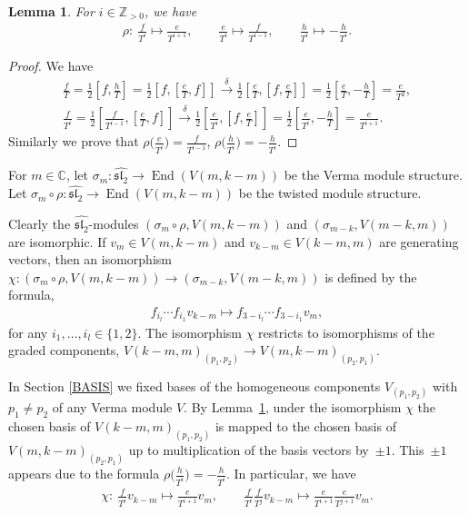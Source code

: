 \documentclass[pdftex]{sigma}
\numberwithin{equation}{section}
\newtheorem{lem}[thm]{Lemma}
\begin{document}
\begin{lem}\label{lem elts}For $i \in \mathbb{Z}_{> 0}$, we have
\begin{gather*}
\rho \colon \ \frac{f}{T^i} \mapsto \frac{e}{T^{i+1}}, \qquad \frac{e}{T^i} \mapsto \frac{f}{T^{i-1}}, \qquad \frac{h}{T^i} \mapsto -\frac{h}{T^i}.
\end{gather*}
\end{lem}
\begin{proof}
We have
\begin{gather*}
\frac{f}{T} = \frac12 \left[f, \frac hT \right] = \frac 12 \left[ f, \left[\frac eT, f \right] \right] \overset{\delta}{\longrightarrow} \frac 12 \left[ \frac eT, \left[f, \frac eT \right] \right] = \frac 12 \left[ \frac eT, - \frac hT \right] = \frac{e}{T^2}, \nonumber \\
\frac{f}{T^i} = \frac 12 \left[ \frac{f}{T^{i-1}}, \left[\frac{e}{T}, f\right] \right] \overset{\delta}{\longrightarrow} \frac 12 \left[ \frac{e}{T^i}, \left[f, \frac eT \right] \right] = \frac 12 \left[ \frac{e}{T^i}, - \frac hT \right] = \frac{e}{T^{i+1}}. \nonumber
\end{gather*}
Similarly we prove that $\rho\big(\frac{e}{T^i}\big) = \frac{f}{T^{i-1}}$, $\rho \big(\frac{h}{T^i}\big) = -\frac{h}{T^i}$.
\end{proof}

For $m\in{\mathbb C}$, let $\sigma_m \colon \widehat{{\mathfrak{sl}_2}} \to \operatorname{End}( V(m,k-m))$ be the Verma module structure. Let $\sigma_m\circ \rho \colon \widehat{{\mathfrak{sl}_2}} \to \operatorname{End}( V(m,k-m))$ be the twisted module structure.

Clearly the $\widehat{{\mathfrak{sl}_2}}$-modules $(\sigma_m\circ \rho, V(m,k-m))$ and $(\sigma_{m-k}, V(m-k,m))$ are isomorphic. If $v_m\in V(m,k-m)$ and $v_{k-m}\in V(k-m,m)$ are generating vectors, then an isomorphism $\chi\colon (\sigma_m\circ \rho, V(m,k-m)) \to (\sigma_{m-k}, V(m-k,m))$ is defined by the formula,
\begin{gather*}
f_{i_l}\cdots f_{i_1}v_{k-m} \mapsto f_{3-i_l}\cdots f_{3-i_1}v_{m},
\end{gather*}
for any $i_1,\dots,i_l\in\{1,2\}$. The isomorphism $\chi$ restricts to isomorphisms of the graded components, $V(k-m,m)_{(p_1,p_2)} \to V(m,k-m)_{(p_2,p_1)}$.

In Section \ref{BASIS} we fixed bases of the homogeneous components $V_{(p_1,p_2)}$ with $p_1\ne p_2$ of any Verma module $V$. By Lemma~\ref{lem elts}, under the isomorphism $\chi$ the chosen basis of $V(k-m, m)_{(p_1,p_2)}$ is mapped to the chosen basis of $V(m,k-m)_{(p_2,p_1)}$ up to multiplication of the basis vectors by~$\pm 1$. This~$\pm 1$ appears due to the formula $\rho\big(\frac h{T^i}\big) = - \frac h{T^i}$. In particular, we have
\begin{gather*}
\chi \colon \ \frac f{T^i}v_{k-m} \mapsto \frac e{T^{i+1}}v_{m}, \qquad
\frac f{T^i} \frac f{T^j} v_{k-m} \mapsto \frac e{T^{i+1}}\frac e{T^{j+1}}v_{m}.
\end{gather*}
\end{document}
